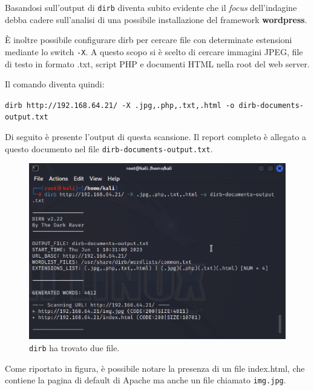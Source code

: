 \documentclass[a4paper, 12pt, oneside]{article}
\begin{document}
\newpage

Basandosi sull'output di \texttt{dirb} diventa subito evidente che il \textit{focus} dell'indagine debba cadere sull'analisi di una possibile installazione del framework \textbf{wordpress}.

È inoltre possibile configurare dirb per cercare file con determinate estensioni mediante lo switch \texttt{-X}. A questo scopo si è scelto di cercare immagini JPEG, file di testo in formato .txt, script PHP e documenti HTML nella root del web server.

Il comando diventa quindi:

\begin{center}
    \texttt{dirb http://192.168.64.21/ -X .jpg,.php,.txt,.html -o dirb-documents-output.txt}
\end{center}

Di seguito è presente l'output di questa scansione. Il report completo è allegato a questo documento nel file \texttt{dirb-documents-output.txt}.

\begin{figure}[h!]
    \centering
    \includegraphics[width=\textwidth]{img/dirb-files-root.png}
    \caption{\texttt{dirb} ha trovato due file.}
\end{figure}

Come riportato in figura, è possibile notare la presenza di un file index.html, che contiene la pagina di default di Apache ma anche un file chiamato \texttt{img.jpg}. 
\end{document}
